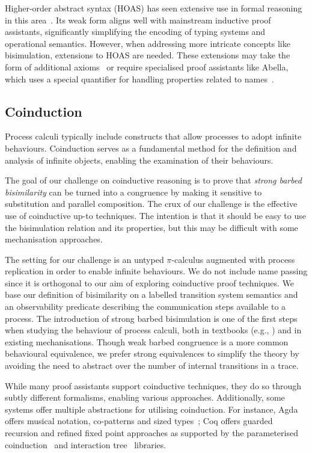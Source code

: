 \documentclass[runningheads]{llncs}
\begin{document}
Higher-order abstract syntax (HOAS) has seen extensive
use in formal reasoning in this area~\cite{Despeyroux2000,Honsell2001,Tiu2010,ChaudhuriCM15,Castro-Perez2021}. Its
weak form aligns well with mainstream inductive proof assistants,
significantly simplifying the encoding of typing systems and operational
semantics. However, when addressing more intricate concepts like
bisimulation, extensions to HOAS are needed. These extensions may take
the form of additional axioms~\cite{Honsell2001} or require specialised proof assistants
like Abella, which uses a special quantifier for handling
properties related to names~\cite{GacekMN11}.

\subsection{Coinduction}

Process calculi typically include constructs that allow processes to
adopt infinite behaviours.  Coinduction serves as a fundamental method
for the definition and analysis of infinite objects, enabling the
examination of their behaviours.

The goal of our challenge on coinductive reasoning is to prove that
\emph{strong barbed bisimilarity} can be turned into a congruence by making
it sensitive to substitution and parallel composition. The crux of our
challenge is the effective use of coinductive up-to techniques.  The
intention is that it should be easy to use the bisimulation relation
and its properties, but this may be difficult with some mechanisation
approaches.

The setting for our challenge is an untyped \(\pi\)-calculus augmented with
process replication in order to enable infinite behaviours.  We do not
include name passing since it is orthogonal to our  aim of exploring coinductive proof techniques.
We base our definition of bisimilarity on a labelled transition system semantics
and an observability predicate describing the communication steps
available to a process.  The introduction of strong barbed
bisimulation is one of the first steps when studying the
behaviour of process calculi, both in textbooks (e.g.,
\cite{picalcbook}) and in existing mechanisations.  Though weak barbed
congruence is a more common behavioural equivalence, we prefer strong
equivalences to simplify the theory by avoiding the need to abstract
over the number of internal transitions in a trace.

While many proof assistants support coinductive techniques, they do so
through subtly different formalisms, enabling various approaches.
Additionally, some systems offer multiple abstractions for utilising coinduction.
For instance, Agda offers musical notation, co-patterns and sized types~\cite{Abel2013};
Coq offers guarded recursion and refined fixed point approaches as supported by the parameterised coinduction~\cite{Hur2013}
and interaction tree~\cite{Xia2019} libraries.
\end{document}
